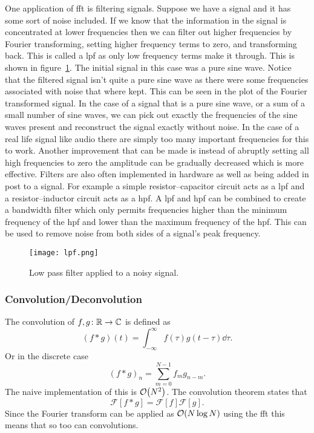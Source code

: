 \documentclass[a4paper]{article}
\newcommand{\FT}{\mathcal{F}}
\newcommand{\convolution}{*}
\begin{document}
    One application of \gls{fft} is filtering signals.
    Suppose we have a signal and it has some sort of noise included.
    If we know that the information in the signal is concentrated at lower frequencies then we can filter out higher frequencies by Fourier transforming, setting higher frequency terms to zero, and transforming back.
    This is called a \gls{lpf} as only low frequency terms make it through.
    This is shown in figure~\ref{fig:lpf}.
    The initial signal in this case was a pure sine wave.
    Notice that the filtered signal isn't quite a pure sine wave as there were some frequencies associated with noise that where kept.
    This can be seen in the plot of the Fourier transformed signal.
    In the case of a signal that is a pure sine wave, or a sum of a small number of sine waves, we can pick out exactly the frequencies of the sine waves present and reconstruct the signal exactly without noise.
    In the case of a real life signal like audio there are simply too many important frequencies for this to work.
    Another improvement that can be made is instead of abruptly setting all high frequencies to zero the amplitude can be gradually decreased which is more effective.
    Filters are also often implemented in hardware as well as being added in post to a signal.
    For example a simple resistor--capacitor circuit acts as a \gls{lpf} and a resistor--inductor circuit acts as a \gls{hpf}.
    A \gls{lpf} and \gls{hpf} can be combined to create a bandwidth filter which only permits frequencies higher than the minimum frequency of the \gls{hpf} and lower than the maximum frequency of the \gls{hpf}.
    This can be used to remove noise from both sides of a signal's peak frequency.
    \begin{figure}[ht]
        \centering
        \texttt{[image: lpf.png]}
        \caption{Low pass filter applied to a noisy signal.}
        \label{fig:lpf}
    \end{figure}

    \subsubsection{Convolution/Deconvolution}
    The convolution of \(f, g\colon\mathbb{R}\to\mathbb{C}\) is defined as
    \[(f\convolution g)(t) = \int_{-\infty}^{\infty} f(\tau)g(t - \tau)\dd{\tau}.\]
    Or in the discrete case
    \[(f\convolution g)_n = \sum_{m=0}^{N-1}f_mg_{n-m}.\]
    The naive implementation of this is \(\order{N^2}\).
    The convolution theorem states that
    \[\FT[f\convolution g] = \FT[f]\FT[g].\]
    Since the Fourier transform can be applied as \(\order{N\log N}\) using the \gls{fft} this means that so too can convolutions.
    
\end{document}

